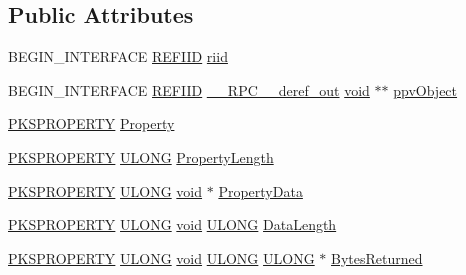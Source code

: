\subsection*{Public Attributes}
\begin{DoxyCompactItemize}
\item 
B\+E\+G\+I\+N\+\_\+\+I\+N\+T\+E\+R\+F\+A\+CE \hyperlink{px__win__ds_8c_a80ec49c8ae61e234197d5071d2df497d}{R\+E\+F\+I\+ID} \hyperlink{struct_i_ks_control_vtbl_aeda49340b0d46e0d76c6dd3762fe75ba}{riid}
\item 
B\+E\+G\+I\+N\+\_\+\+I\+N\+T\+E\+R\+F\+A\+CE \hyperlink{px__win__ds_8c_a80ec49c8ae61e234197d5071d2df497d}{R\+E\+F\+I\+ID} \hyperlink{rpcsal_8h_a23bc188526f10656f9c79d950f6c3192}{\+\_\+\+\_\+\+R\+P\+C\+\_\+\+\_\+deref\+\_\+out} \hyperlink{sound_8c_ae35f5844602719cf66324f4de2a658b3}{void} $\ast$$\ast$ \hyperlink{struct_i_ks_control_vtbl_af294a71f21f5ac3b91b33d5d16d6c22c}{ppv\+Object}
\item 
\hyperlink{ks_8h_a9b11bbb1c8ab9f3b558a344c02778874}{P\+K\+S\+P\+R\+O\+P\+E\+R\+TY} \hyperlink{struct_i_ks_control_vtbl_af237693984e6ddd442f6d54e43eaa34b}{Property}
\item 
\hyperlink{ks_8h_a9b11bbb1c8ab9f3b558a344c02778874}{P\+K\+S\+P\+R\+O\+P\+E\+R\+TY} \hyperlink{struct_i_ks_control_vtbl_aae3f0def17c6497582a6236050236922}{U\+L\+O\+NG} \hyperlink{struct_i_ks_control_vtbl_ac663f8f3c61a364070f0c0fab00efa9f}{Property\+Length}
\item 
\hyperlink{ks_8h_a9b11bbb1c8ab9f3b558a344c02778874}{P\+K\+S\+P\+R\+O\+P\+E\+R\+TY} \hyperlink{struct_i_ks_control_vtbl_aae3f0def17c6497582a6236050236922}{U\+L\+O\+NG} \hyperlink{sound_8c_ae35f5844602719cf66324f4de2a658b3}{void} $\ast$ \hyperlink{struct_i_ks_control_vtbl_a7ea466a7929adb9a77169a60b2aa0963}{Property\+Data}
\item 
\hyperlink{ks_8h_a9b11bbb1c8ab9f3b558a344c02778874}{P\+K\+S\+P\+R\+O\+P\+E\+R\+TY} \hyperlink{struct_i_ks_control_vtbl_aae3f0def17c6497582a6236050236922}{U\+L\+O\+NG} \hyperlink{sound_8c_ae35f5844602719cf66324f4de2a658b3}{void} \hyperlink{struct_i_ks_control_vtbl_aae3f0def17c6497582a6236050236922}{U\+L\+O\+NG} \hyperlink{struct_i_ks_control_vtbl_ab39a430f94b3026b82f40e7a6a9061b9}{Data\+Length}
\item 
\hyperlink{ks_8h_a9b11bbb1c8ab9f3b558a344c02778874}{P\+K\+S\+P\+R\+O\+P\+E\+R\+TY} \hyperlink{struct_i_ks_control_vtbl_aae3f0def17c6497582a6236050236922}{U\+L\+O\+NG} \hyperlink{sound_8c_ae35f5844602719cf66324f4de2a658b3}{void} \hyperlink{struct_i_ks_control_vtbl_aae3f0def17c6497582a6236050236922}{U\+L\+O\+NG} \hyperlink{struct_i_ks_control_vtbl_aae3f0def17c6497582a6236050236922}{U\+L\+O\+NG} $\ast$ \hyperlink{struct_i_ks_control_vtbl_a0da716e6e5488850961c1bbdc2c3929d}{Bytes\+Returned}
$$
\end{DoxyCompactItemize}
